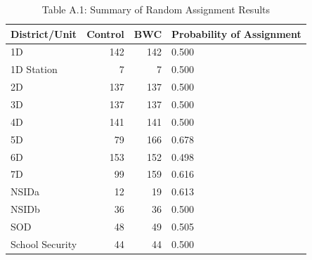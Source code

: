 \begin{table}

\caption{Table A.1: Summary of Random Assignment Results}
\centering
\begin{tabular}[t]{lrrl}
\toprule
District/Unit & Control & BWC & Probability of Assignment\\
\midrule
1D & 142 & 142 & 0.500\\
1D Station & 7 & 7 & 0.500\\
2D & 137 & 137 & 0.500\\
3D & 137 & 137 & 0.500\\
4D & 141 & 141 & 0.500\\
\addlinespace
5D & 79 & 166 & 0.678\\
6D & 153 & 152 & 0.498\\
7D & 99 & 159 & 0.616\\
NSIDa & 12 & 19 & 0.613\\
NSIDb & 36 & 36 & 0.500\\
\addlinespace
SOD & 48 & 49 & 0.505\\
School Security & 44 & 44 & 0.500\\
\bottomrule
\end{tabular}
\end{table}
